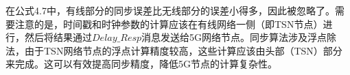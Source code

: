 \documentclass[UTF8,a4paper,12pt]{ctexart}
\numberwithin{equation}{section}
\begin{document}
	在公式4.7中，有线部分的同步误差比无线部分的误差小得多，因此被忽略了。需要注意的是，时间戳和时钟参数的计算应该在有线网络一侧（即TSN节点）进行，然后将结果通过$Delay\_Resp$消息发送给5G网络节点。同步算法涉及浮点除法，由于TSN网络节点的浮点计算精度较高，这些计算应该由头部（TSN）部分来完成。这可以有效提高同步精度，降低5G节点的计算复杂性。
	\begin{figure}[H] 
	\end{figure}
	
\end{document}

